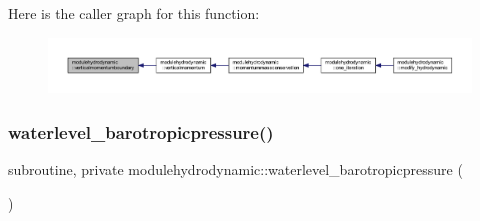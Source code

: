 Here is the caller graph for this function\+:\nopagebreak
\begin{figure}[H]
\begin{center}
\leavevmode
\includegraphics[width=350pt]{namespacemodulehydrodynamic_a7b6e382d0318b7799ad5228e8148e1ac_icgraph}
\end{center}
\end{figure}
\mbox{\label{namespacemodulehydrodynamic_a5e6cdcb5121c8a2db4d545b07bfd4d73}} 
\subsubsection{\texorpdfstring{waterlevel\+\_\+barotropicpressure()}{waterlevel\_barotropicpressure()}}
{\footnotesize\ttfamily subroutine, private modulehydrodynamic\+::waterlevel\+\_\+barotropicpressure (\begin{DoxyParamCaption}{ }\end{DoxyParamCaption})\hspace{0.3cm}{\ttfamily [private]}}

